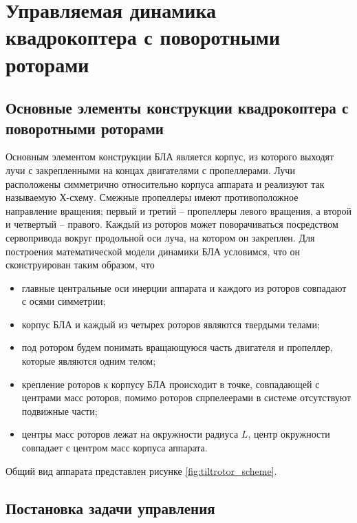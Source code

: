 
\chapter{Управляемая динамика квадрокоптера с поворотными роторами}

\section{Основные элементы конструкции квадрокоптера с поворотными роторами}

Основным элементом конструкции БЛА является корпус, из которого выходят лучи с закрепленными на концах двигателями с пропеллерами. Лучи расположены симметрично относительно корпуса аппарата и реализуют так называемую Х-схему. Смежные пропеллеры имеют противоположное направление вращения; первый и третий – пропеллеры левого вращения, а второй и четвертый – правого. Каждый из роторов может поворачиваться посредством сервопривода вокруг продольной оси луча, на котором он закреплен. Для построения математической модели динамики БЛА условимся, что он сконструирован таким образом, что
\begin{itemize}
	\item главные центральные оси инерции аппарата и каждого из роторов совпадают с осями симметрии; 
	\item корпус БЛА и каждый из четырех роторов являются твердыми телами; 
	\item под ротором будем понимать вращающуюся часть двигателя и пропеллер, которые являются одним телом; 
	\item крепление роторов к корпусу БЛА происходит в точке, совпадающей с центрами масс роторов, помимо роторов спрпелеерами в системе отсутствуют подвижные части;
	\item центры масс роторов лежат на окружности радиуса $L$, центр окружности совпадает с центром масс корпуса аппарата.
\end{itemize}
Общий вид аппарата представлен рисунке \ref{fig:tiltrotor_scheme}.

\section{Постановка задачи управления}
\label{section_ctrl_task}

